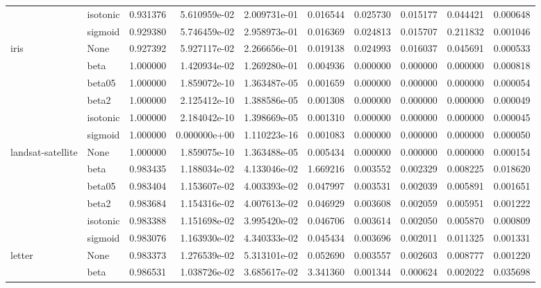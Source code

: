 \begin{tabular}{llrrrrrrrr}
        & isotonic &  0.931376 &  5.610959e-02 &  2.009731e-01 &   0.016544 &  0.025730 &  0.015177 &  0.044421 &  0.000648 \\
        & sigmoid &  0.929380 &  5.746459e-02 &  2.958973e-01 &   0.016369 &  0.024813 &  0.015707 &  0.211832 &  0.001046 \\
iris & None &  0.927392 &  5.927117e-02 &  2.266656e-01 &   0.019138 &  0.024993 &  0.016037 &  0.045691 &  0.000533 \\
        & beta &  1.000000 &  1.420934e-02 &  1.269280e-01 &   0.004936 &  0.000000 &  0.000000 &  0.000000 &  0.000818 \\
        & beta05 &  1.000000 &  1.859072e-10 &  1.363487e-05 &   0.001659 &  0.000000 &  0.000000 &  0.000000 &  0.000054 \\
        & beta2 &  1.000000 &  2.125412e-10 &  1.388586e-05 &   0.001308 &  0.000000 &  0.000000 &  0.000000 &  0.000049 \\
        & isotonic &  1.000000 &  2.184042e-10 &  1.398669e-05 &   0.001310 &  0.000000 &  0.000000 &  0.000000 &  0.000045 \\
        & sigmoid &  1.000000 &  0.000000e+00 &  1.110223e-16 &   0.001083 &  0.000000 &  0.000000 &  0.000000 &  0.000050 \\
landsat-satellite & None &  1.000000 &  1.859075e-10 &  1.363488e-05 &   0.005434 &  0.000000 &  0.000000 &  0.000000 &  0.000154 \\
        & beta &  0.983435 &  1.188034e-02 &  4.133046e-02 &   1.669216 &  0.003552 &  0.002329 &  0.008225 &  0.018620 \\
        & beta05 &  0.983404 &  1.153607e-02 &  4.003393e-02 &   0.047997 &  0.003531 &  0.002039 &  0.005891 &  0.001651 \\
        & beta2 &  0.983684 &  1.154316e-02 &  4.007613e-02 &   0.046929 &  0.003608 &  0.002059 &  0.005951 &  0.001222 \\
        & isotonic &  0.983388 &  1.151698e-02 &  3.995420e-02 &   0.046706 &  0.003614 &  0.002050 &  0.005870 &  0.000809 \\
        & sigmoid &  0.983076 &  1.163930e-02 &  4.340333e-02 &   0.045434 &  0.003696 &  0.002011 &  0.011325 &  0.001331 \\
letter & None &  0.983373 &  1.276539e-02 &  5.313101e-02 &   0.052690 &  0.003557 &  0.002603 &  0.008777 &  0.001220 \\
        & beta &  0.986531 &  1.038726e-02 &  3.685617e-02 &   3.341360 &  0.001344 &  0.000624 &  0.002022 &  0.035698 \\

\end{tabular}
